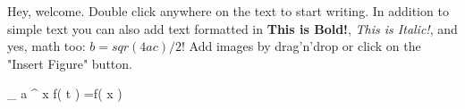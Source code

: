 Hey, welcome. Double click anywhere on the text to start writing. In addition to simple text you can also add text formatted in \textbf{This is Bold!}, \textit{This is Italic!}, and yes, math too: $b = sqr(4ac)/2$! Add images by drag'n'drop or click on the "Insert Figure" button.

 \int _{ a }^{ x }{ f\left( t \right) =f\left( x \right)  } 